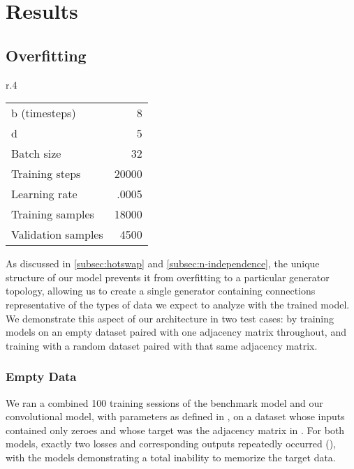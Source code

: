 \graphicspath{ {resources/models/3neurEx/} {resources/models/3neurEx/weights/} } 

\chapter{Results}
\label{results}
\section{Overfitting}
\label{sec:overfitting}
\setlength{\columnsep}{20pt}
\begin{wraptable}[8]{r}{.4\textwidth}
	\captionsetup{justification=centering}
	\vspace{-20pt}
	\begin{tabular}{lr}
		b (timesteps) & 8\\
		d& 5\\
		Batch size& 32\\
		Training steps& 20000\\
		Learning rate& .0005\\
		Training samples& 18000\\
		Validation samples& 4500
	\end{tabular}
	\vspace{-5pt}
	\label{fig:nullparams}
\end{wraptable}
As discussed in \ref{subsec:hotswap} and \ref{subsec:n-independence}, the unique 
structure of our model prevents it from overfitting to a particular generator 
topology, allowing us to create a single generator containing connections 
representative of the types of data we expect to analyze with the trained model.
We demonstrate this aspect of our architecture in two test cases: by training 
models on an empty dataset paired with one adjacency matrix throughout, and 
training with a random dataset paired with that same adjacency matrix.

\subsection{Empty Data}
\label{subsec:empty}
We ran a combined 100 training sessions of the benchmark model and our 
convolutional model, with parameters as defined in , on a 
dataset whose inputs contained only zeroes and whose target was the adjacency 
matrix in . For both models, exactly two losses 
and corresponding outputs repeatedly occurred (), with 
the models demonstrating a total inability to memorize the target data.

